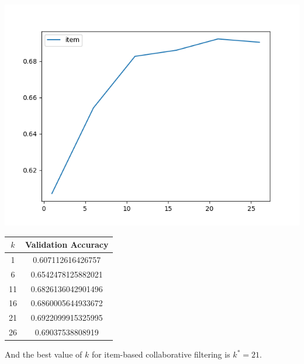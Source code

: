 \documentclass{article}
\begin{document}
\begin{enumerate}[label=\arabic*.]
\begin{enumerate}[label=(\alph*)]
                \noindent
                \begin{minipage}{0.5\linewidth}
                    \centering
                    \includegraphics[width=\linewidth]{../starter_code/figs/knn_item.png}
                \end{minipage}\hfill
                \begin{minipage}{0.5\linewidth}
                    \center
                    \begin{tabular}{c|c}
                        $k$ & Validation Accuracy \\\hline
                        1 & 0.607112616426757\\
                        6 & 0.6542478125882021\\
                        11 & 0.6826136042901496\\
                        16 & 0.6860005644933672\\
                        21 & 0.6922099915325995\\
                        26 & 0.69037538808919
                    \end{tabular}
                \end{minipage}
                And the best value of $k$ for item-based collaborative filtering is $k^*=21$.


\end{enumerate}
\end{enumerate}
\end{document}
